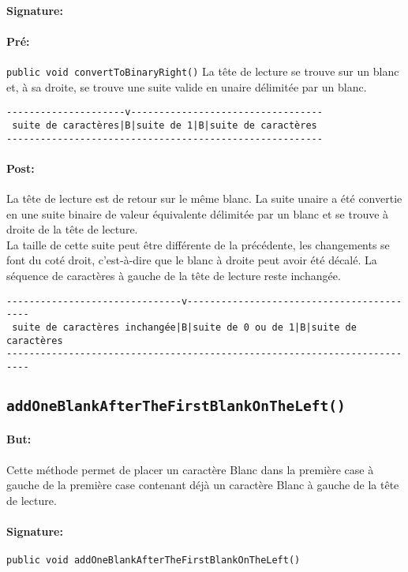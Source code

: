 \documentclass[a4paper,11pt]{article}
\begin{document}
\paragraph{Signature:}
\paragraph{Pré:} \texttt{public void convertToBinaryRight()}
La tête de lecture se trouve sur un blanc et, à sa droite, se trouve une suite valide en unaire délimitée par un blanc.
\begin{verbatim}
---------------------v----------------------------------
 suite de caractères|B|suite de 1|B|suite de caractères
--------------------------------------------------------
\end{verbatim}
\paragraph{Post:}
La tête de lecture est de retour sur le même blanc. La suite unaire a été convertie en une suite binaire de valeur équivalente délimitée par un blanc et se trouve à droite de la tête de lecture.\\
La taille de cette suite peut être différente de la précédente, les changements se font du coté droit, c'est-à-dire que le blanc à droite peut avoir été décalé. La séquence de caractères à gauche de la tête de lecture reste inchangée.
\begin{verbatim}
-------------------------------v------------------------------------------
 suite de caractères inchangée|B|suite de 0 ou de 1|B|suite de caractères
--------------------------------------------------------------------------
\end{verbatim}
\subsection{\texttt{addOneBlankAfterTheFirstBlankOnTheLeft()}}
\paragraph{But:} Cette méthode permet de placer un caractère Blanc dans la première case à gauche de la première case contenant déjà un caractère Blanc à gauche de la tête de lecture.
\paragraph{Signature:} \texttt{public void addOneBlankAfterTheFirstBlankOnTheLeft()}
\end{document}
